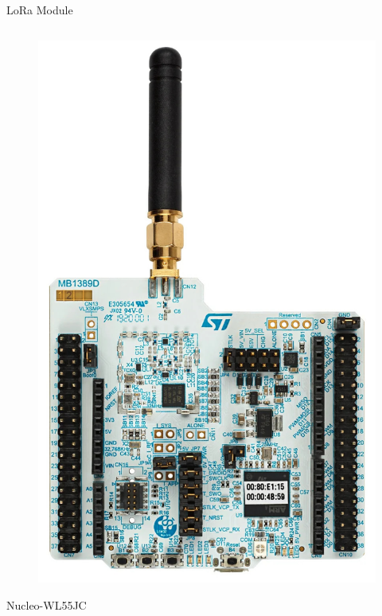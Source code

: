\documentclass[hyphens]{beamer}
\begin{document}
\begin{frame}{LoRa Module}
\begin{columns}[T]
\begin{column}{.3\textwidth}
\begin{figure}
        \includegraphics[width=\linewidth]{img/nucleo-wl55jc.jpg}
    \end{figure}
    Nucleo-WL55JC
\end{column}
\end{columns}
\end{frame}
\end{document}
